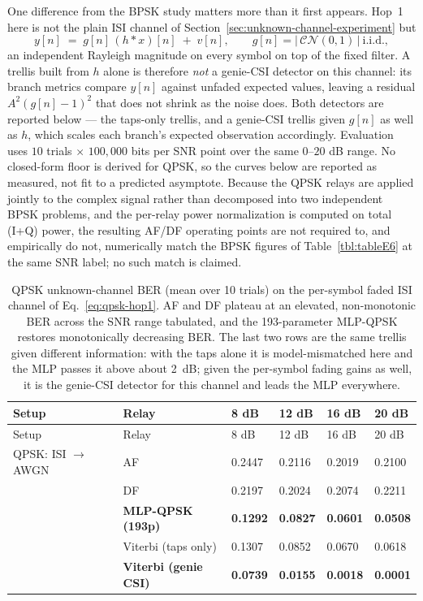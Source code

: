 One difference from the BPSK study matters more than it first appears. Hop~1 here is not the plain ISI channel of Section~\ref{sec:unknown-channel-experiment} but
\begin{equation}\label{eq:qpsk-hop1}
y[n] \;=\; g[n]\,(h * x)[n] \;+\; v[n], \qquad g[n] = |\,\mathcal{CN}(0,1)\,|\ \text{i.i.d.},
\end{equation}
an independent Rayleigh magnitude on every symbol on top of the fixed filter. A trellis built from $h$ alone is therefore \emph{not} a genie-CSI detector on this channel: its branch metrics compare $y[n]$ against unfaded expected values, leaving a residual $A^{2}(g[n]-1)^{2}$ that does not shrink as the noise does. Both detectors are reported below --- the taps-only trellis, and a genie-CSI trellis given $g[n]$ as well as $h$, which scales each branch's expected observation accordingly. Evaluation uses $10$ trials $\times$ $100{,}000$ bits per SNR point over the same $0$--$20$ dB range. No closed-form floor is derived for QPSK, so the curves below are reported as measured, not fit to a predicted asymptote. Because the QPSK relays are applied jointly to the complex signal rather than decomposed into two independent BPSK problems, and the per-relay power normalization is computed on total (I+Q) power, the resulting AF/DF operating points are not required to, and empirically do not, numerically match the BPSK figures of Table~\ref{tbl:tableE6} at the same SNR label; no such match is claimed.

\begin{longtable}[]{@{}llllll@{}}
\caption[QPSK unknown-channel BER (mean over 10 trials)]{QPSK unknown-channel BER (mean over 10 trials) on the per-symbol faded ISI channel of Eq.~\eqref{eq:qpsk-hop1}. AF and DF plateau at an elevated, non-monotonic BER across the SNR range tabulated, and the 193-parameter MLP-QPSK restores monotonically decreasing BER. The last two rows are the same trellis given different information: with the taps alone it is model-mismatched here and the MLP passes it above about 2~dB; given the per-symbol fading gains as well, it is the genie-CSI detector for this channel and leads the MLP everywhere.}\label{tbl:tableE6qpsk}\tabularnewline
\toprule\noalign{}
Setup & Relay & 8 dB & 12 dB & 16 dB & 20 dB \\
\midrule\noalign{}
\endfirsthead
\toprule\noalign{}
Setup & Relay & 8 dB & 12 dB & 16 dB & 20 dB \\
\midrule\noalign{}
\endhead
\bottomrule\noalign{}
\endlastfoot
QPSK: ISI $\to$ AWGN & AF & 0.2447 & 0.2116 & 0.2019 & 0.2100 \\
 & DF & 0.2197 & 0.2024 & 0.2074 & 0.2211 \\
 & \textbf{MLP-QPSK (193p)} & \textbf{0.1292} & \textbf{0.0827} & \textbf{0.0601} & \textbf{0.0508} \\
 & Viterbi (taps only) & 0.1307 & 0.0852 & 0.0670 & 0.0618 \\
 & \textbf{Viterbi (genie CSI)} & \textbf{0.0739} & \textbf{0.0155} & \textbf{0.0018} & \textbf{0.0001} \\
\end{longtable}

